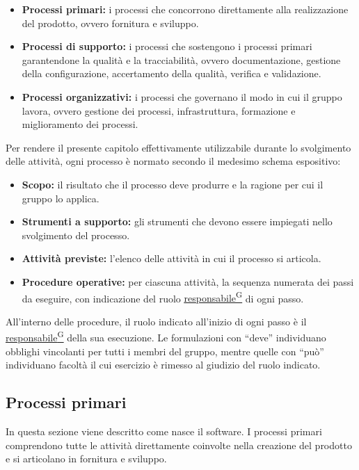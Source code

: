 \documentclass[a4paper,12pt]{article}
\providecommand{\glslink}[2]{\href{https://alittlebyte-19.github.io/Documentazione/glossario.html\#gls-#1}{\underline{#2}\textsuperscript{\scriptsize G}}}
\begin{document}
\begin{itemize}
    \item \textbf{Processi primari:} i processi che concorrono direttamente alla realizzazione del prodotto, ovvero fornitura e sviluppo.
    \item \textbf{Processi di supporto:} i processi che sostengono i processi primari garantendone la qualità e la tracciabilità, ovvero documentazione, gestione della configurazione, accertamento della qualità, verifica e validazione.
    \item \textbf{Processi organizzativi:} i processi che governano il modo in cui il gruppo lavora, ovvero gestione dei processi, infrastruttura, formazione e miglioramento dei processi.
\end{itemize}

Per rendere il presente capitolo effettivamente utilizzabile durante lo svolgimento delle attività, ogni processo è normato secondo il medesimo schema espositivo:

\begin{itemize}
    \item \textbf{Scopo:} il risultato che il processo deve produrre e la ragione per cui il gruppo lo applica.
    \item \textbf{Strumenti a supporto:} gli strumenti che devono essere impiegati nello svolgimento del processo.
    \item \textbf{Attività previste:} l'elenco delle attività in cui il processo si articola.
    \item \textbf{Procedure operative:} per ciascuna attività, la sequenza numerata dei passi da eseguire, con indicazione del ruolo \glslink{responsabile}{responsabile} di ogni passo.
\end{itemize}

All'interno delle procedure, il ruolo indicato all'inizio di ogni passo è il \glslink{responsabile}{responsabile} della sua esecuzione. Le formulazioni con ``deve'' individuano obblighi vincolanti per tutti i membri del gruppo, mentre quelle con ``può'' individuano facoltà il cui esercizio è rimesso al giudizio del ruolo indicato.

\subsection{Processi primari}
In questa sezione viene descritto come nasce il software. I processi primari comprendono tutte le attività direttamente coinvolte nella creazione del prodotto e si articolano in fornitura e sviluppo.
\end{document}
